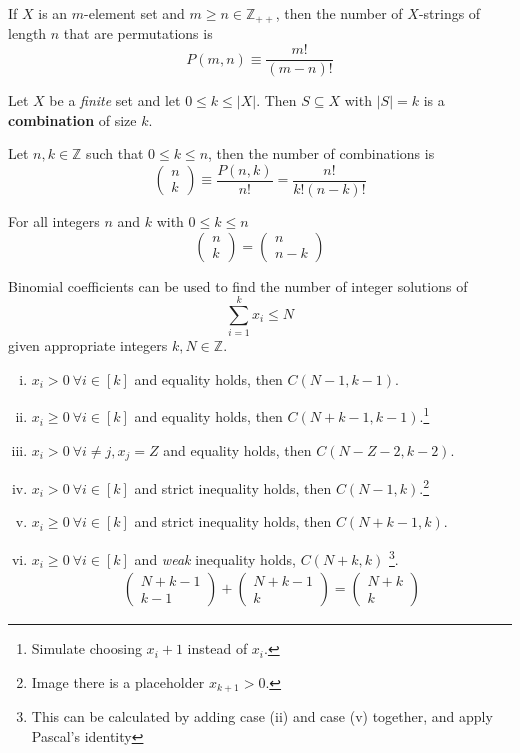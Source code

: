 \documentclass{article}
\def\Z{{\mathbb Z}}
\newcommand{\bi}[2]{\begin{pmatrix}{#1}\\{#2}\end{pmatrix}}
\begin{document}
			\begin{proposition}
				If $X$ is an $m$-element set and $m \geq n \in \Z_{++}$, then the number of $X$-strings of length $n$ that are permutations is 
				\begin{equation}
					P(m, n) \equiv \frac{m!}{(m-n)!}
				\end{equation}
			\end{proposition}
			
			\begin{definition}
				Let $X$ be a \emph{finite} set and let $0 \leq k \leq |X|$. Then $S \subseteq X$ with $|S| = k$ is a \textbf{combination} of size $k$.
			\end{definition}
			
			\begin{proposition}
				Let $n, k \in \Z$ such that $0 \leq k \leq n$, then the number of combinations is
				\begin{equation}
					\bi{n}{k} \equiv \frac{P(n, k)}{n!} = \frac{n!}{k!(n-k)!}
				\end{equation}
			\end{proposition}
			
			\begin{proposition}
				For all integers $n$ and $k$ with $0 \leq k \leq n$
				\begin{equation}
					\bi{n}{k} = \bi{n}{n-k}
				\end{equation}
			\end{proposition}
			
			\begin{example}
				Binomial coefficients can be used to find the number of integer solutions of
				\begin{equation}
					\sum_{i=1}^k x_i \leq N
				\end{equation}
				given appropriate integers $k, N \in \Z$.
				\begin{enumerate}[(i)]
					\item $x_i > 0\ \forall i \in [k]$ and equality holds, then $C(N-1, k-1)$.
					\item $x_i \geq 0\ \forall i \in [k]$ and equality holds, then $C(N+k-1, k-1)$.\footnote{Simulate choosing $x_i + 1$ instead of $x_i$.}
					\item $x_i > 0\ \forall i \neq j, x_j = Z$ and equality holds, then $C(N-Z-2,k-2)$.
					\item $x_i > 0\ \forall i \in [k]$ and strict inequality holds, then $C(N-1, k)$.\footnote{Image there is a placeholder $x_{k+1} > 0$.}
					\item $x_i \geq 0\ \forall i \in [k]$ and strict inequality holds, then $C(N+k-1, k)$.
					\item $x_i \geq 0\ \forall i \in [k]$ and \emph{weak} inequality holds, $C(N+k, k)$ \footnote{This can be calculated by adding case (ii) and case (v) together, and apply Pascal's identity}.
					\begin{gather}
						\bi{N+k-1}{k-1} + \bi{N+k-1}{k} = \bi{N+k}{k}
					\end{gather}
				\end{enumerate}
			\end{example}
			
\end{document}

